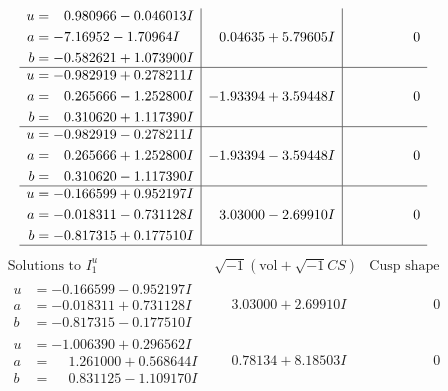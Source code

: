 \documentclass[1p]{elsarticle_modified}
\theoremstyle{definition}
\newcommand{\I}{\sqrt{-1}}
\begin{document}
$$\begin{array}{c|c|c}
\begin{aligned}
u &= \phantom{-}0.980966 - 0.046013 I \\
a &= -7.16952 - 1.70964 I \\
b &= -0.582621 + 1.073900 I\end{aligned}
 & \phantom{-}0.04635 + 5.79605 I & \phantom{-0.000000 } 0 \\ \hline\begin{aligned}
u &= -0.982919 + 0.278211 I \\
a &= \phantom{-}0.265666 - 1.252800 I \\
b &= \phantom{-}0.310620 + 1.117390 I\end{aligned}
 & -1.93394 + 3.59448 I & \phantom{-0.000000 } 0 \\ \hline\begin{aligned}
u &= -0.982919 - 0.278211 I \\
a &= \phantom{-}0.265666 + 1.252800 I \\
b &= \phantom{-}0.310620 - 1.117390 I\end{aligned}
 & -1.93394 - 3.59448 I & \phantom{-0.000000 } 0 \\ \hline\begin{aligned}
u &= -0.166599 + 0.952197 I \\
a &= -0.018311 - 0.731128 I \\
b &= -0.817315 + 0.177510 I\end{aligned}
 & \phantom{-}3.03000 - 2.69910 I & \phantom{-0.000000 } 0\\
 \hline 
 \end{array}$$\newpage$$\begin{array}{c|c|c}  
\text{Solutions to }I^u_{1}& \I (\text{vol} + \sqrt{-1}CS) & \text{Cusp shape}\\
 \hline 
\begin{aligned}
u &= -0.166599 - 0.952197 I \\
a &= -0.018311 + 0.731128 I \\
b &= -0.817315 - 0.177510 I\end{aligned}
 & \phantom{-}3.03000 + 2.69910 I & \phantom{-0.000000 } 0 \\ \hline\begin{aligned}
u &= -1.006390 + 0.296562 I \\
a &= \phantom{-}1.261000 + 0.568644 I \\
b &= \phantom{-}0.831125 - 1.109170 I\end{aligned}
 & \phantom{-}0.78134 + 8.18503 I & \phantom{-0.000000 } 0 \\ \hline\begin{aligned}

\end{aligned}
\end{array}$$
\end{document}
